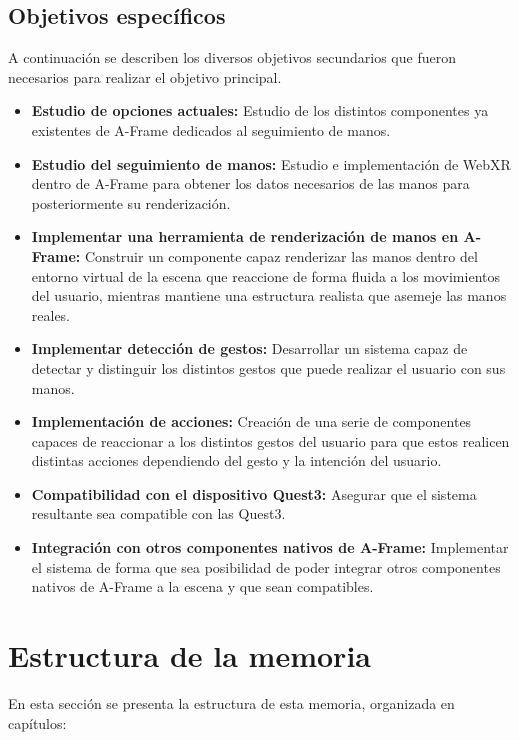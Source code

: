\documentclass[a4paper, 12pt]{book}
\begin{document}
\subsection{Objetivos específicos}
\label{subsec:objetivos-especificos}
A continuación se describen los diversos objetivos secundarios que fueron necesarios para realizar el objetivo principal.
\begin{itemize}
  \item \textbf{Estudio de opciones actuales:} Estudio de los distintos componentes ya existentes de A-Frame dedicados al seguimiento de manos.
  \item \textbf{Estudio del seguimiento de manos:} Estudio e implementación de WebXR dentro de A-Frame para obtener los datos necesarios de las manos para posteriormente su renderización.
  \item \textbf{Implementar una herramienta de renderización de manos en A-Frame:} Construir un componente capaz renderizar las manos dentro del entorno virtual de la escena que reaccione de forma fluida a los movimientos del usuario, mientras mantiene una estructura realista que asemeje las manos reales. 
  \item \textbf{Implementar detección de gestos:} Desarrollar un sistema capaz de detectar y distinguir los distintos gestos que puede realizar el usuario con sus manos.
  \item \textbf{Implementación de acciones:} Creación de una serie de componentes capaces de reaccionar a los distintos gestos del usuario para que estos realicen distintas acciones dependiendo del gesto y la intención del usuario. 
  \item \textbf{Compatibilidad con el dispositivo Quest3:} Asegurar que el sistema resultante sea compatible con las Quest3.
  \item \textbf{Integración con otros componentes nativos de A-Frame:} Implementar el sistema de forma que sea posibilidad de poder integrar otros componentes nativos de A-Frame a la escena y que sean compatibles.
\end{itemize}

\section{Estructura de la memoria}
\label{subsec:estructura}
En esta sección se presenta la estructura de esta memoria, organizada en capítulos:
\end{document}
